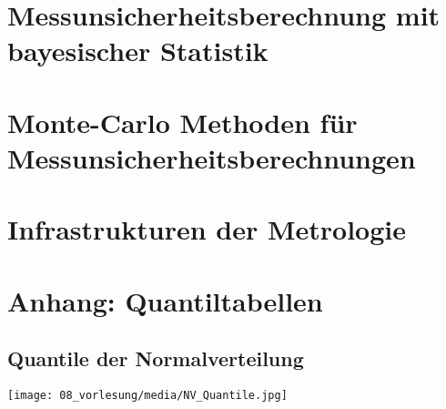 \documentclass[a4paper,11pt]{book}
\begin{document}
\chapter{Messunsicherheitsberechnung mit bayesischer Statistik}
\label{bayesMU}


\chapter{Monte-Carlo Methoden für Messunsicherheitsberechnungen}
\label{montecarloMU}


\chapter{Infrastrukturen der Metrologie}


\chapter{Anhang: Quantiltabellen}
\label{quantiltabellen}
\section{Quantile der Normalverteilung}
\begin{center}
 \texttt{[image: 08\_vorlesung/media/NV\_Quantile.jpg]}
\end{center}

\end{document}
